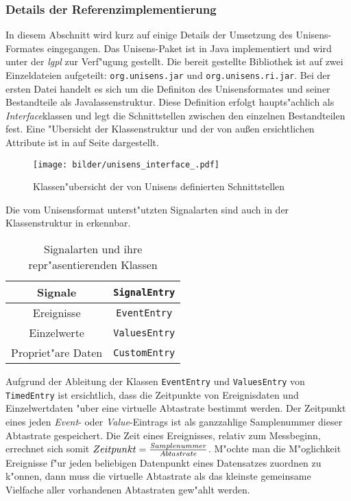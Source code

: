 \subsubsection{Details der Referenzimplementierung}

In diesem Abschnitt wird kurz auf einige Details der Umsetzung des Unisens-Formates eingegangen.
Das Unisens-Paket ist in Java implementiert und wird unter der \emph{\ac{lgpl}} zur Verf"ugung gestellt.
Die bereit gestellte Bibliothek ist auf zwei Einzeldateien aufgeteilt: \verb|org.unisens.jar| und \verb|org.unisens.ri.jar|.
Bei der ersten Datei handelt es sich um die Definiton des Unisensformates und seiner Bestandteile als Javalassenstruktur.
Diese Definition erfolgt haupts"achlich als \emph{Interface}klassen und legt die Schnittstellen zwischen den einzelnen Bestandteilen fest.
Eine "Ubersicht der Klassenstruktur und der von au\ss en ersichtlichen Attribute ist in  auf Seite \pageref{pic:unisens_interface} dargestellt.
\begin{sidewaysfigure}%
\centering
\texttt{[image: bilder/unisens\_interface\_.pdf]}
\caption{Klassen"ubersicht der von Unisens definierten Schnittstellen}
\label{pic:unisens_interface}
\end{sidewaysfigure}
Die vom Unisensformat unterst"utzten Signalarten sind auch in der Klassenstruktur in  erkennbar.
\begin{table}[h]
\centering
\begin{tabular}{|c|c|}
	\hline Signale & \verb|SignalEntry| \\
	\hline Ereignisse & \verb|EventEntry| \\
	\hline Einzelwerte & \verb|ValuesEntry| \\
	\hline Propriet"are Daten & \verb|CustomEntry| \\
	\hline
\end{tabular}
\caption{Signalarten und ihre repr"asentierenden Klassen}
\label{tab:unisens_signalklassen}
\end{table}

Aufgrund der Ableitung der Klassen \verb|EventEntry| und \verb|ValuesEntry| von \verb|TimedEntry| ist ersichtlich, dass die Zeitpunkte von Ereignisdaten und Einzelwertdaten "uber eine virtuelle Abtastrate bestimmt werden.
Der Zeitpunkt eines jeden \emph{Event}- oder \emph{Value}-Eintrags ist als ganzzahlige Samplenummer dieser Abtastrate gespeichert.
Die Zeit eines Ereignisses, relativ zum Messbeginn, errechnet sich somit $Zeitpunkt = {Samplenummer \over Abtastrate}$.
M"ochte man die M"oglichkeit Ereignisse f"ur jeden beliebigen Datenpunkt eines Datensatzes zuordnen zu k"onnen, dann muss die virtuelle Abtastrate als das kleinste gemeinsame Vielfache aller vorhandenen Abtastraten gew"ahlt werden.

